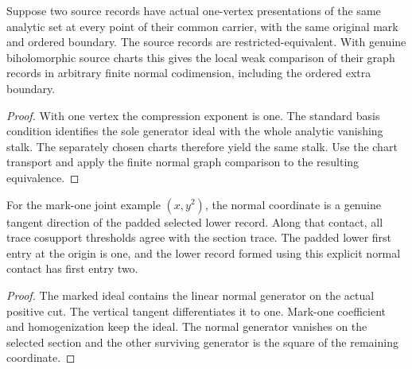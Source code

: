 \begin{theorem}
\label{hir:g1-independent-one-vertex-source}
\leanok
Suppose two source records have actual one-vertex presentations of
the same analytic set at every point of their common carrier, with
the same original mark and ordered boundary. The source records are
restricted-equivalent. With genuine biholomorphic source charts this
gives the local weak comparison of their graph records in arbitrary
finite normal codimension, including the ordered extra boundary.
\end{theorem}
\begin{proof}
With one vertex the compression exponent is one. The standard
basis condition identifies the sole generator ideal with the
whole analytic vanishing stalk. The separately chosen charts
therefore yield the same stalk. Use the chart transport and apply
the finite normal graph comparison to the resulting equivalence.
\end{proof}

\begin{theorem}
\label{hir:g1-finite-example-chosen-normal-contact}
\leanok
For the mark-one joint example $(x,y^2)$, the normal coordinate is
a genuine tangent direction of the padded selected lower record.
Along that contact, all trace cosupport thresholds agree with the
section trace. The padded lower first entry at the origin is one,
and the lower record formed using this explicit normal contact has
first entry two.
\end{theorem}
\begin{proof}
The marked ideal contains the linear normal generator on the
actual positive cut. The vertical tangent differentiates it to
one. Mark-one coefficient and homogenization keep the ideal.
The normal generator vanishes on the selected section and the
other surviving generator is the square of the remaining coordinate.
\end{proof}

